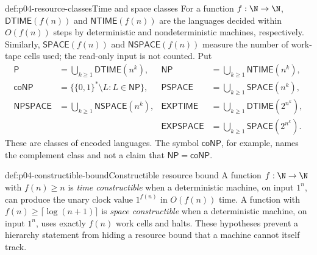 \begin{hbdefinition}{def:p04-resource-classes}{Time and space classes}
For a function \(f:\N\to\N\), \(\mathsf{DTIME}(f(n))\) and
\(\mathsf{NTIME}(f(n))\) are the languages decided within \(O(f(n))\) steps
by deterministic and nondeterministic machines, respectively.
Similarly, \(\mathsf{SPACE}(f(n))\) and \(\mathsf{NSPACE}(f(n))\) measure the
number of work-tape cells used; the read-only input is not counted.  Put
\[
\begin{aligned}
 \mathsf P&=\bigcup_{k\geq1}\mathsf{DTIME}(n^k),&
 \mathsf{NP}&=\bigcup_{k\geq1}\mathsf{NTIME}(n^k),\\
 \mathsf{coNP}&=\{\{0,1\}^*\setminus L:L\in\mathsf{NP}\},&
 \mathsf{PSPACE}&=\bigcup_{k\geq1}\mathsf{SPACE}(n^k),\\
 \mathsf{NPSPACE}&=\bigcup_{k\geq1}\mathsf{NSPACE}(n^k),&
 \mathsf{EXPTIME}&=\bigcup_{k\geq1}\mathsf{DTIME}(2^{n^k}),\\
 &&\mathsf{EXPSPACE}&=\bigcup_{k\geq1}\mathsf{SPACE}(2^{n^k}).
\end{aligned}
\]
These are classes of encoded languages.  The symbol \(\mathsf{coNP}\), for
example, names the complement class and not a claim that
\(\mathsf{NP}=\mathsf{coNP}\).
\end{hbdefinition}

\begin{hbdefinition}{def:p04-constructible-bound}{Constructible resource bound}
A function \(f:\N\to\N\) with \(f(n)\geq n\) is \emph{time constructible} when a deterministic
machine, on input \(1^n\), can produce the unary clock value \(1^{f(n)}\) in
\(O(f(n))\) time.  A function with
\(f(n)\geq\lceil\log(n+1)\rceil\) is \emph{space constructible} when a deterministic
machine, on input \(1^n\), uses exactly \(f(n)\) work cells and halts.  These
hypotheses prevent a hierarchy statement from hiding a resource bound that a
machine cannot itself track.
\end{hbdefinition}

